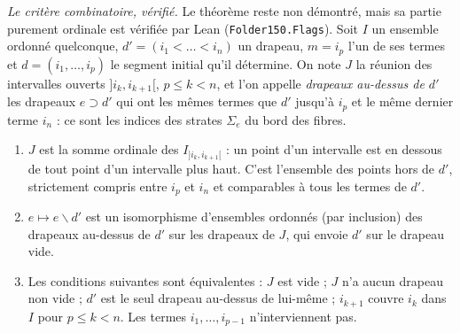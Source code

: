 \noindent\emph{Le critère combinatoire, vérifié.} Le théorème reste non démontré, mais sa partie purement ordinale est vérifiée par Lean (\texttt{Folder150.Flags}). Soit $I$ un ensemble ordonné quelconque, $d' = (i_1 < \dots < i_n)$ un drapeau, $m = i_p$ l'un de ses termes et $d = (i_1, \dots, i_p)$ le segment initial qu'il détermine. On note $J$ la réunion des intervalles ouverts $]i_k, i_{k+1}[$, $p \leq k < n$, et l'on appelle \emph{drapeaux au-dessus de $d'$} les drapeaux $e \supset d'$ qui ont les mêmes termes que $d'$ jusqu'à $i_p$ et le même dernier terme $i_n$ : ce sont les indices des strates $\Sigma_e$ du bord des fibres.

\begin{encadre}
\begin{enonce}\leavevmode
\begin{enumerate}
\item[(i)] $J$ est la somme ordinale des $I_{]i_k, i_{k+1}[}$ : un point d'un intervalle est en dessous de tout point d'un intervalle plus haut. C'est l'ensemble des points hors de $d'$, strictement compris entre $i_p$ et $i_n$ et comparables à tous les termes de $d'$.
\item[(ii)] $e \mapsto e \smallsetminus d'$ est un isomorphisme d'ensembles ordonnés (par inclusion) des drapeaux au-dessus de $d'$ sur les drapeaux de $J$, qui envoie $d'$ sur le drapeau vide.
\item[(iii)] Les conditions suivantes sont équivalentes : $J$ est vide ; $J$ n'a aucun drapeau non vide ; $d'$ est le seul drapeau au-dessus de lui-même ; $i_{k+1}$ couvre $i_k$ dans $I$ pour $p \leq k < n$. Les termes $i_1, \dots, i_{p-1}$ n'interviennent pas.
\end{enumerate}
\end{enonce}
\end{encadre}

